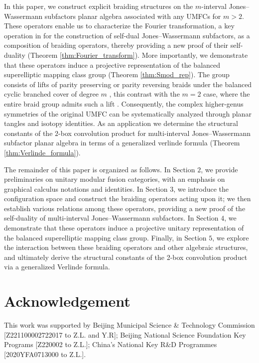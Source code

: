 \documentclass{amsart}
\begin{document}
In this paper, we construct explicit braiding structures on the $m$-interval Jones–Wassermann subfactors planar algebra associated with any UMFCs for $m>2$. These operators enable us to characterize the Fourier transformation, a key operation in \cite{LX19} for the construction of self-dual Jones–Wassermann subfactors, as a composition of braiding operators, thereby providing a new proof of their self-duality (Theorem \ref{thm:Fourier_transform}). More importantly, we demonstrate that these operators induce a projective representation of the balanced superelliptic mapping class group (Theorem \ref{thm:Smod_rep}). The group consists of lifts of parity preserving or parity reversing braids under the balanced cyclic branched cover of degree $m$ \cite{GW17lifting}, this contrast with the $m=2$ case, where the entire braid group admits such a lift \cite{BH73,MW21}. Consequently, the complex higher-genus symmetries of the original UMFC can be systematically analyzed through planar tangles and isotopy identities. As an application we determine the structural constants of the $2$-box convolution product  for multi-interval Jones–Wassermann subfactor planar algebra in terms of a generalized verlinde formula (Theorem \ref{thm:Verlinde_formula}). 

The remainder of this paper is organized as follows. In Section $2$, we provide preliminaries on unitary modular fusion categories, with an emphasis on graphical calculus notations and identities. In Section $3$, we introduce the configuration space and construct the braiding operators acting upon it; we then establish various relations among these operators, providing a new proof of the self-duality of multi-interval Jones–Wassermann subfactors. In Section $4$, we demonstrate that these operators induce a projective unitary representation of the balanced superelliptic mapping class group. Finally, in Section $5$, we explore the interaction between these braiding operators and other algebraic structures, and ultimately derive the structural constants of the 2-box convolution product via a generalized Verlinde formula.

\section*{Acknowledgement}
This work was supported by Beijing Municipal Science \& Technology Commission [Z221100002722017 to Z.L. and Y.R]; Beijing National Science Foundation Key Programs [Z220002 to Z.L.]; China’s National Key R\&D Programmes [2020YFA0713000 to Z.L.].
\end{document}
